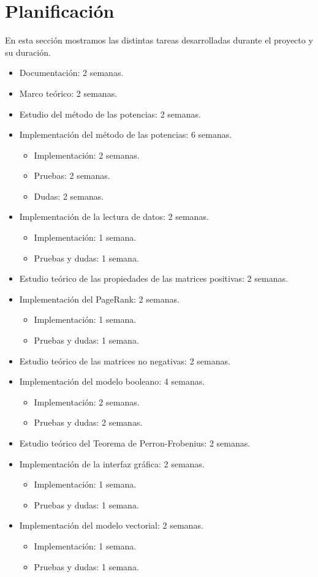 \documentclass[size=a4, parskip=half, titlepage=false, toc=flat, toc=bib, 12pt]{scrartcl}
\theoremstyle{theorem-style}
\theoremstyle{definition-style}
\theoremstyle{remark-style}
\theoremstyle{example-style}
\theoremstyle{definition-style}
\theoremstyle{remark-style}
\begin{document}
\section{Planificación}
En esta sección mostramos las distintas tareas desarrolladas durante el proyecto y su duración.
\begin{itemize}
\item Documentación: 2 semanas.
\item Marco teórico: 2 semanas.
\item Estudio del método de las potencias: 2 semanas.
\item Implementación del método de las potencias: 6 semanas.
\begin{itemize}
\item Implementación: 2 semanas.
\item Pruebas: 2 semanas.
\item Dudas: 2 semanas.
\end{itemize}
\item Implementación de la lectura de datos: 2 semanas.
\begin{itemize}
\item Implementación: 1 semana.
\item Pruebas y dudas: 1 semana.
\end{itemize}
\item Estudio teórico de las propiedades de las matrices positivas: 2 semanas.
\item Implementación del PageRank: 2 semanas.
\begin{itemize}
\item Implementación: 1 semana.
\item Pruebas y dudas: 1 semana.
\end{itemize}
\item Estudio teórico de las matrices no negativas: 2 semanas.
\item Implementación del modelo booleano: 4 semanas.
\begin{itemize}
\item Implementación: 2 semanas.
\item Pruebas y dudas: 2 semanas.
\end{itemize}
\item Estudio teórico del Teorema de Perron-Frobenius: 2 semanas.
\item Implementación de la interfaz gráfica: 2 semanas.
\begin{itemize}
\item Implementación: 1 semana.
\item Pruebas y dudas: 1 semana.
\end{itemize}
\item Implementación del modelo vectorial: 2 semanas.
\begin{itemize}
\item Implementación: 1 semana.
\item Pruebas y dudas: 1 semana.
\end{itemize}
\end{itemize}
\end{document}
